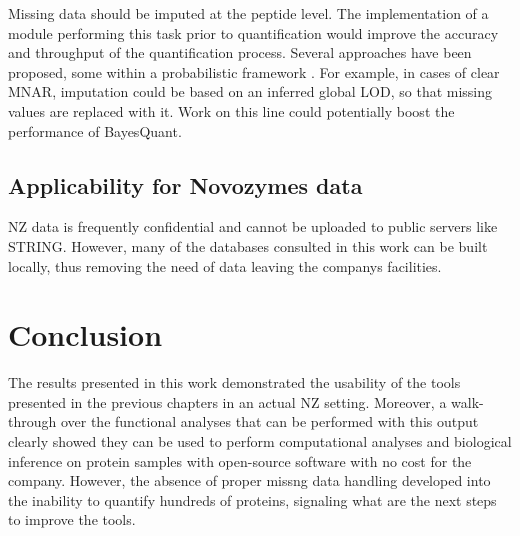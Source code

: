 Missing data should be imputed at the peptide level. The implementation of a module performing this task prior to quantification would  improve the accuracy and throughput of the quantification process. Several approaches have been proposed, some within a probabilistic framework \cite{Lazar2016}. For example, in cases of clear \ac{MNAR}, imputation could be based on an inferred global \ac{LOD}, so that missing values are replaced with it. Work on this line could potentially boost the performance of BayesQuant.


\subsection{Applicability for Novozymes data}

\ac{NZ} data is frequently confidential and cannot be uploaded to public servers like STRING. However, many of the databases consulted in this work can be built locally, thus removing the need of data leaving the company\textquotesingle s facilities.



\section{Conclusion}
The results presented in this work demonstrated the usability of the tools presented in the previous chapters in an actual \ac{NZ} setting. Moreover, a walk-through over the functional analyses that can be performed with this output clearly showed they can be used to perform computational analyses and biological inference on protein samples with open-source software with no cost for the company. However, the absence of proper missng data handling developed into the inability to quantify hundreds of proteins, signaling what are the next steps to improve the tools.